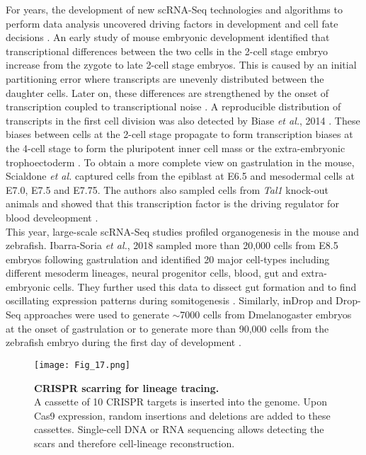 For years, the development of new scRNA-Seq technologies and algorithms to perform data analysis uncovered driving factors in development and cell fate decisions \citep{Griffiths2018}. An early study of mouse embryonic development identified that transcriptional differences between the two cells in the 2-cell stage embryo increase from the zygote to late 2-cell stage embryos. This is caused by an initial partitioning error where transcripts are unevenly distributed between the daughter cells. Later on, these differences are strengthened by the onset of transcription coupled to transcriptional noise \citep{Piras2014, Shi2015a}. A reproducible distribution of transcripts in the first cell division was also detected by Biase \emph{et al.}, 2014 \cite{Biase2014}. These biases between cells at the 2-cell stage propagate to form transcription biases at the 4-cell stage to form the pluripotent inner cell mass or the extra-embryonic trophoectoderm \citep{Goolam2016, Shi2015a}. To obtain a more complete view on gastrulation in the mouse, Scialdone \emph{et al.} captured cells from the epiblast at E6.5 and mesodermal cells at E7.0, E7.5 and E7.75. The authors also sampled cells from \emph{Tal1} knock-out animals and showed that this transcription factor is the driving regulator for blood develeopment \citep{Scialdone2016}. \\

This year, large-scale scRNA-Seq studies profiled organogenesis in the mouse and zebrafish. Ibarra-Soria \emph{et al.}, 2018 sampled more than 20,000 cells from E8.5 embryos following gastrulation and identified 20 major cell-types including different mesoderm lineages, neural progenitor cells, blood, gut and extra-embryonic cells. They further used this data to dissect gut formation and to find oscillating expression patterns during somitogenesis \citep{Ibarra-Soria2018}. Similarly, inDrop and Drop-Seq approaches were used to generate $\sim$7000 cells from \gls{Dmelanogaster} embryos at the onset of gastrulation \citep{Karaiskos2017} or to generate more than 90,000 cells from the zebrafish embryo during the first day of development \citep{Wagner2018}.

\begin{figure}[!h]
\centering
\texttt{[image: Fig\_17.png]}
\caption[CRISPR scarring for lineage tracing]{\textbf{CRISPR scarring for lineage tracing.}\\
A cassette of 10 CRISPR targets is inserted into the genome. Upon Cas9 expression, random insertions and deletions are added to these cassettes. Single-cell DNA or RNA sequencing allows detecting the scars and therefore cell-lineage reconstruction.}
\label{fig0:CRISPR}
\end{figure}


